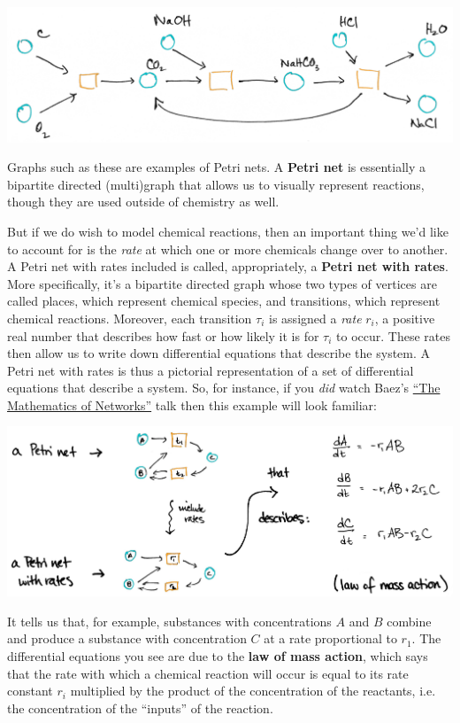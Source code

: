 \documentclass{tufte-handout-tai}
\theoremstyle{plain}
\theoremstyle{definition}
\theoremstyle{remark}
\begin{document}
\begin{center}
\includegraphics{chemicals2.jpg}
\end{center}
Graphs such as these are examples of Petri nets. A \textbf{Petri net} is essentially a bipartite directed (multi)graph that allows us to visually represent reactions, though they are used outside of chemistry as well. 

But if we do wish to model chemical reactions, then an important thing we'd like to account for is the \textit{rate} at which one or more chemicals change over to another. A Petri net with rates included is called, appropriately, a  \textbf{Petri net with rates}. More specifically, it's a bipartite directed graph whose two types of vertices are called \textcolor{BlueGreen}{places}, which represent chemical species, and \textcolor{BurntOrange}{transitions}, which represent chemical reactions. Moreover, each transition $\tau_i$ is assigned a \textit{rate} $r_i$, a positive real number that describes how fast or how likely it is for $\tau_i$ to occur. These rates then allow us to write down differential equations that describe the system. A Petri net with rates is thus a pictorial representation of a set of differential equations that describe a system. So, for instance, if you \textit{did} watch Baez's \href{https://www.youtube.com/watch?v=IyJP_7ucwWo}{``The Mathematics of Networks''} talk then this example will look familiar:
\begin{center}
\includegraphics[width=!,totalheight=!,scale=0.13]{petri.jpg}
\end{center}
It tells us that, for example, substances with concentrations $A$ and $B$ combine and produce a substance with concentration $C$ at a rate proportional to $r_1.$ The differential equations you see are due to the \textbf{law of mass action}, which says that the rate with which a chemical reaction will occur is equal to its rate constant $r_i$ multiplied by the product of the concentration of the reactants, i.e. the concentration of the ``inputs'' of the reaction.
\end{document}
